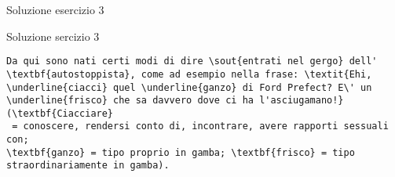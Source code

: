 \begin{frame}[fragile]{Soluzione esercizio 3}

\begin{block}{Soluzione sercizio 3}
\begin{lstlisting}
Da qui sono nati certi modi di dire \sout{entrati nel gergo} dell'
\textbf{autostoppista}, come ad esempio nella frase: \textit{Ehi, 
\underline{ciacci} quel \underline{ganzo} di Ford Prefect? E\' un
\underline{frisco} che sa davvero dove ci ha l'asciugamano!} (\textbf{Ciacciare}
 = conoscere, rendersi conto di, incontrare, avere rapporti sessuali con; 
\textbf{ganzo} = tipo proprio in gamba; \textbf{frisco} = tipo
straordinariamente in gamba).
\end{lstlisting}
\end{block}

\end{frame}